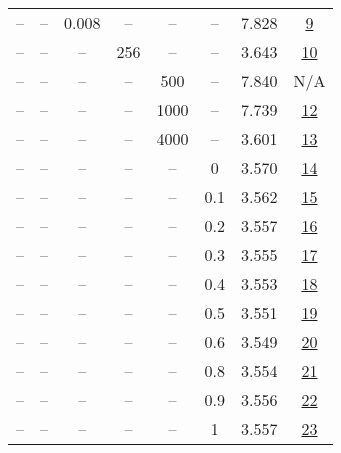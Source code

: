 \begin{table}[H]
\begin{tabular}{cccccccc}
-- & -- & 0.008 & -- & -- & -- & 7.828 & \href{https://wandb.ai/stanford-mercury/optimizer-scaling/runs/sweep-130m-2B-lionaa59dalr0.008-wd0.7-minlr0-warmup2000-b10.9-b2-37a612}{9} \\
-- & -- & -- & 256 & -- & -- & 3.643 & \href{https://wandb.ai/stanford-mercury/optimizer-scaling/runs/sweep-130m-2B-lion8ae51alr0.002-wd0.7-minlr0-warmup2000-b10.9-b2-8365f3}{10} \\
-- & -- & -- & -- & 500 & -- & 7.840 & N/A \\
-- & -- & -- & -- & 1000 & -- & 7.739 & \href{https://wandb.ai/stanford-mercury/optimizer-scaling/runs/sweep-130m-2B-liona9ab24lr0.002-wd0.7-minlr0-warmup1000-b10.9-b2-2a731e}{12} \\
-- & -- & -- & -- & 4000 & -- & 3.601 & \href{https://wandb.ai/stanford-mercury/optimizer-scaling/runs/sweep-130m-2B-lionea298blr0.002-wd0.7-minlr0-warmup4000-b10.9-b2-db95d5}{13} \\
-- & -- & -- & -- & -- & 0 & 3.570 & \href{https://wandb.ai/stanford-mercury/optimizer-scaling/runs/sweep-130m-2B-lion148492lr0.002-wd0-minlr0-warmup2000-b10.9-b20.-110cc7}{14} \\
-- & -- & -- & -- & -- & 0.1 & 3.562 & \href{https://wandb.ai/stanford-mercury/optimizer-scaling/runs/sweep-130m-2B-lion18acaelr0.002-wd0.1-minlr0-warmup2000-b10.9-b2-7ddf09}{15} \\
-- & -- & -- & -- & -- & 0.2 & 3.557 & \href{https://wandb.ai/stanford-mercury/optimizer-scaling/runs/sweep-130m-2B-lion1e546elr0.002-wd0.2-minlr0-warmup2000-b10.9-b2-aa9725}{16} \\
-- & -- & -- & -- & -- & 0.3 & 3.555 & \href{https://wandb.ai/stanford-mercury/optimizer-scaling/runs/sweep-130m-2B-liond40922lr0.002-wd0.3-minlr0-warmup2000-b10.9-b2-100dbc}{17} \\
-- & -- & -- & -- & -- & 0.4 & 3.553 & \href{https://wandb.ai/stanford-mercury/optimizer-scaling/runs/sweep-130m-2B-lionee963alr0.002-wd0.4-minlr0-warmup2000-b10.9-b2-c0140d}{18} \\
-- & -- & -- & -- & -- & 0.5 & 3.551 & \href{https://wandb.ai/stanford-mercury/optimizer-scaling/runs/sweep-130m-2B-lione7dbf0lr0.002-wd0.5-minlr0-warmup2000-b10.9-b2-9b5fa8}{19} \\
-- & -- & -- & -- & -- & 0.6 & 3.549 & \href{https://wandb.ai/stanford-mercury/optimizer-scaling/runs/sweep-130m-2B-liony3cdaaelr0.002-wd0.6-minlr0-warmup2000-b10.9-b-e1600d}{20} \\
-- & -- & -- & -- & -- & 0.8 & 3.554 & \href{https://wandb.ai/stanford-mercury/optimizer-scaling/runs/sweep-130m-2B-lione8dba4lr0.002-wd0.8-minlr0-warmup2000-b10.9-b2-a40177}{21} \\
-- & -- & -- & -- & -- & 0.9 & 3.556 & \href{https://wandb.ai/stanford-mercury/optimizer-scaling/runs/sweep-130m-2B-liond64d1flr0.002-wd0.9-minlr0-warmup2000-b10.9-b2-977068}{22} \\
-- & -- & -- & -- & -- & 1 & 3.557 & \href{https://wandb.ai/stanford-mercury/optimizer-scaling/runs/sweep-130m-2B-lionb541cclr0.002-wd1-minlr0-warmup2000-b10.9-b20.-2ad246}{23} \\
\bottomrule
\end{tabular}
\end{table}

